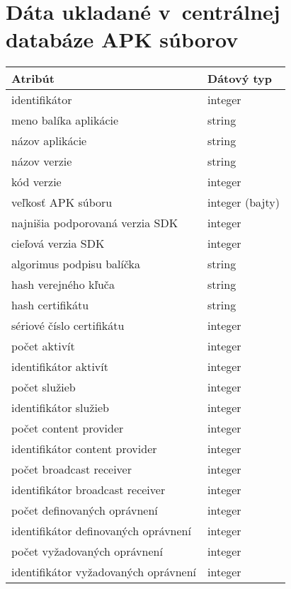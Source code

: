 \chapter{Dáta ukladané v~centrálnej databáze APK súborov}
\label{zbieraneDataPriloha}
\begin{longtable}{|l|p{3.3cm}|}
\hline
\textbf{Atribút} & \textbf{Dátový typ}          \\ \hline
identifikátor                                   & integer         \\
meno balíka aplikácie                           & string 		  \\
názov aplikácie                                      & string             \\
názov verzie                                      & string      \\
kód verzie                                      & integer \\
veľkosť APK súboru                                      & integer (bajty)        \\
najnišia podporovaná verzia SDK 			& integer \\
cieľová verzia SDK							& integer \\
algorimus podpisu balíčka					& string \\
hash verejného kľuča 						& string \\
hash certifikátu							& string \\
sériové číslo certifikátu					& integer \\
počet aktivít								& integer \\
identifikátor aktivít								& integer \\
počet služieb								& integer \\
identifikátor služieb								& integer \\
počet content provider								& integer \\
identifikátor content provider								& integer \\
počet broadcast receiver								& integer \\
identifikátor broadcast receiver								& integer \\
počet definovaných oprávnení								& integer \\
identifikátor definovaných oprávnení								& integer \\
počet vyžadovaných oprávnení								& integer \\
identifikátor vyžadovaných oprávnení								& integer \\

\end{longtable}

